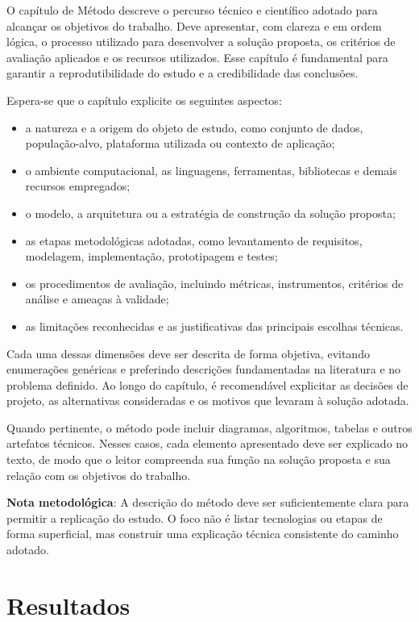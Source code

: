 \documentclass{eic-bcc-tcc}
\begin{document}
O capítulo de Método descreve o percurso técnico e científico adotado para alcançar os objetivos do trabalho. Deve apresentar, com clareza e em ordem lógica, o processo utilizado para desenvolver a solução proposta, os critérios de avaliação aplicados e os recursos utilizados. Esse capítulo é fundamental para garantir a reprodutibilidade do estudo e a credibilidade das conclusões.

Espera-se que o capítulo explicite os seguintes aspectos:
\begin{itemize}
    \item a natureza e a origem do objeto de estudo, como conjunto de dados, população-alvo, plataforma utilizada ou contexto de aplicação;
    \item o ambiente computacional, as linguagens, ferramentas, bibliotecas e demais recursos empregados;
    \item o modelo, a arquitetura ou a estratégia de construção da solução proposta;
    \item as etapas metodológicas adotadas, como levantamento de requisitos, modelagem, implementação, prototipagem e testes;
    \item os procedimentos de avaliação, incluindo métricas, instrumentos, critérios de análise e ameaças à validade;
    \item as limitações reconhecidas e as justificativas das principais escolhas técnicas.
\end{itemize}

Cada uma dessas dimensões deve ser descrita de forma objetiva, evitando enumerações genéricas e preferindo descrições fundamentadas na literatura e no problema definido. Ao longo do capítulo, é recomendável explicitar as decisões de projeto, as alternativas consideradas e os motivos que levaram à solução adotada.

Quando pertinente, o método pode incluir diagramas, algoritmos, tabelas e outros artefatos técnicos. Nesses casos, cada elemento apresentado deve ser explicado no texto, de modo que o leitor compreenda sua função na solução proposta e sua relação com os objetivos do trabalho.

\textbf{Nota metodológica}: A descrição do método deve ser suficientemente clara para permitir a replicação do estudo. O foco não é listar tecnologias ou etapas de forma superficial, mas construir uma explicação técnica consistente do caminho adotado.


\chapter{Resultados}
\label{cha:resultados}
\end{document}
